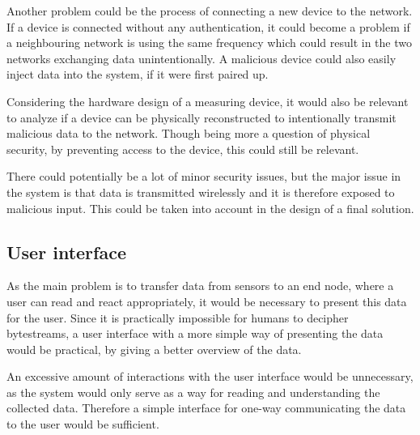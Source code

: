 Another problem could be the process of connecting a new device to the network. If a device is connected without any authentication, it could become a problem if a neighbouring network is using the same frequency which could result in the two networks exchanging data unintentionally. A malicious device could also easily inject data into the system, if it were first paired up.

Considering the hardware design of a measuring device, it would also be relevant to analyze if a device can be physically reconstructed to intentionally transmit malicious data to the network. Though being more a question of physical security, by preventing access to the device, this could still be relevant.

There could potentially be a lot of minor security issues, but the major issue in the system is that data is transmitted wirelessly and it is therefore exposed to malicious input. This could be taken into account in the design of a final solution.

\subsection{User interface}
As the main problem is to transfer data from sensors to an end node, where a user can read and react appropriately, it would be necessary to present this data for the user. Since it is practically impossible for humans to decipher bytestreams, a user interface with a more simple way of presenting the data would be practical, by giving a better overview of the data.

An excessive amount of interactions with the user interface would be unnecessary, as the system would only serve as a way for reading and understanding the collected data. Therefore a simple interface for one-way communicating the data to the user would be sufficient.
